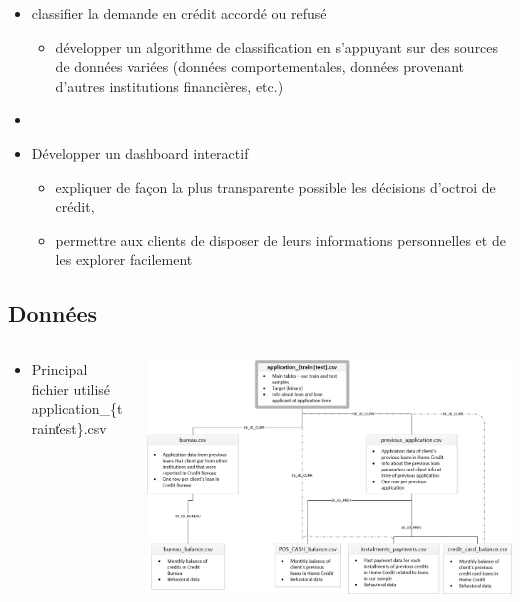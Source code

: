 \documentclass[8pt,aspectratio=169,hyperref={unicode=true}]{beamer}
\begin{document}
\begin{frame}{\insertsubsection}
\begin{itemize}
\begin{itemize}
                  \item classifier la demande en crédit accordé ou refusé
                        \begin{itemize}
                            \item développer un algorithme de classification en s’appuyant sur des sources de données variées (données comportementales, données provenant d'autres institutions financières, etc.)
                        \end{itemize}
                  \item[]
                  \item Développer un dashboard interactif
                        \begin{itemize}
                            \item expliquer de façon la plus transparente possible les décisions d’octroi de crédit,
                            \item permettre aux clients de disposer de leurs informations personnelles et de les explorer facilement
                        \end{itemize}
              \end{itemize}
    \end{itemize}
\end{frame}

\subsection{Données}
\begin{frame}{\insertsubsection}
    \begin{columns}
        \begin{column}{.4\textwidth}
            \begin{itemize}
                \item Principal fichier utilisé application\_\{train\|test\}.csv
            \end{itemize}
        \end{column}
        \begin{column}{.6\textwidth}
            \includegraphics[width=\textwidth]{./home_credit.png}
        \end{column}
    \end{columns}
\end{frame}
\end{document}
